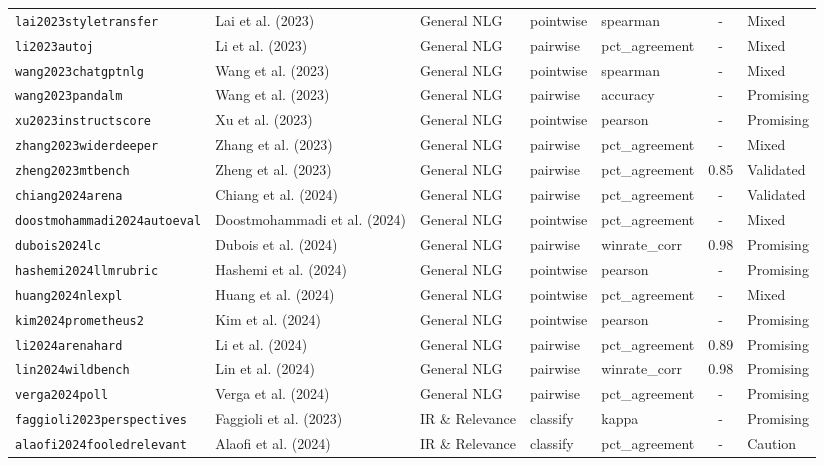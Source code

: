 \begin{longtable}{@{}l l l l l c l@{}}
\texttt{lai2023styletransfer} & Lai et al. (2023) & General NLG & pointwise & spearman & - & Mixed \\
\texttt{li2023autoj} & Li et al. (2023) & General NLG & pairwise & pct\_agreement & - & Mixed \\
\texttt{wang2023chatgptnlg} & Wang et al. (2023) & General NLG & pointwise & spearman & - & Mixed \\
\texttt{wang2023pandalm} & Wang et al. (2023) & General NLG & pairwise & accuracy & - & Promising \\
\texttt{xu2023instructscore} & Xu et al. (2023) & General NLG & pointwise & pearson & - & Promising \\
\texttt{zhang2023widerdeeper} & Zhang et al. (2023) & General NLG & pairwise & pct\_agreement & - & Mixed \\
\texttt{zheng2023mtbench} & Zheng et al. (2023) & General NLG & pairwise & pct\_agreement & 0.85 & Validated \\
\texttt{chiang2024arena} & Chiang et al. (2024) & General NLG & pairwise & pct\_agreement & - & Validated \\
\texttt{doostmohammadi2024autoeval} & Doostmohammadi et al. (2024) & General NLG & pointwise & pct\_agreement & - & Mixed \\
\texttt{dubois2024lc} & Dubois et al. (2024) & General NLG & pairwise & winrate\_corr & 0.98 & Promising \\
\texttt{hashemi2024llmrubric} & Hashemi et al. (2024) & General NLG & pointwise & pearson & - & Promising \\
\texttt{huang2024nlexpl} & Huang et al. (2024) & General NLG & pointwise & pct\_agreement & - & Mixed \\
\texttt{kim2024prometheus2} & Kim et al. (2024) & General NLG & pointwise & pearson & - & Promising \\
\texttt{li2024arenahard} & Li et al. (2024) & General NLG & pairwise & pct\_agreement & 0.89 & Promising \\
\texttt{lin2024wildbench} & Lin et al. (2024) & General NLG & pairwise & winrate\_corr & 0.98 & Promising \\
\texttt{verga2024poll} & Verga et al. (2024) & General NLG & pairwise & pct\_agreement & - & Promising \\
\texttt{faggioli2023perspectives} & Faggioli et al. (2023) & IR \& Relevance & classify & kappa & - & Promising \\
\texttt{alaofi2024fooledrelevant} & Alaofi et al. (2024) & IR \& Relevance & classify & pct\_agreement & - & Caution \\

\end{longtable}
